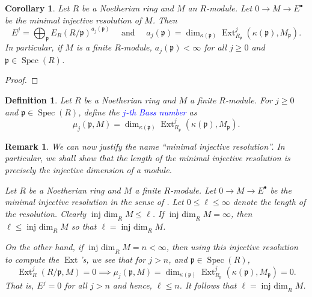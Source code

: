 \documentclass[10pt]{article}
\theoremstyle{thmstyle}
\theoremstyle{defstyle}
\newtheorem{definition}[theorem]{Definition}
\newtheorem{corollary}[theorem]{Corollary}
\newtheorem{remark}[theorem]{Remark}
\newcommand{\Spec}{\operatorname{Spec}}
\newcommand{\frakp}{\mathfrak{p}} %
\newcommand{\define}[1]{\textcolor{blue}{\textit{#1}}}
\renewcommand{\le}{\leqslant}
\renewcommand{\ge}{\geqslant}
\newcommand{\Ext}{\operatorname{Ext}}
\newcommand{\injdim}{\operatorname{inj~dim}}
\begin{document}
\begin{corollary}
    Let $R$ be a Noetherian ring and $M$ an $R$-module. Let $0\to M\to E^\bullet$ be \emph{the} minimal injective resolution of $M$. Then 
    \begin{equation*}
        E^j = \bigoplus_{\frakp}E_R\left(R/\frakp\right)^{a_j(\frakp)}\quad\text{ and }\quad a_j(\frakp) = \dim_{\kappa(\frakp)} \Ext^j_{R_\frakp}\left(\kappa(\frakp), M_\frakp\right).
    \end{equation*}
    In particular, if $M$ is a finite $R$-module, $a_j(\frakp) < \infty$ for all $j\ge 0$ and $\frakp\in\Spec(R)$.
\end{corollary}
\begin{proof}
\end{proof}

\begin{definition}
    Let $R$ be a Noetherian ring and $M$ a finite $R$-module. For $j\ge 0$ and $\frakp\in\Spec(R)$, define the \define{$j$-th Bass number} as 
    \begin{equation*}
        \mu_j\left(\frakp, M\right) = \dim_{\kappa(\frakp)}\Ext_{R_\frakp}^j\left(\kappa(\frakp), M_\frakp\right).
    \end{equation*}
\end{definition}

\begin{remark}
    We can now justify the name ``minimal injective resolution''. In particular, we shall show that the length of the minimal injective resolution is precisely the injective dimension of a module. 
    
    Let $R$ be a Noetherian ring and $M$ a finite $R$-module. Let $0\to M\to E^\bullet$ be \emph{the} minimal injective resolution in the sense of . Let $0\le\ell\le\infty$ denote the length of the resolution. Clearly $\injdim_R M\le\ell$. If $\injdim_R M = \infty$, then $\ell\le\injdim_R M$ so that $\ell = \injdim_R M$. 

    On the other hand, if $\injdim_R M = n < \infty$, then using this injective resolution to compute the $\Ext$'s, we see that for $j > n$, and $\frakp\in\Spec(R)$, 
    \begin{equation*}
        \Ext^{j}_R(R/\frakp, M) = 0\implies\mu_j(\frakp, M) = \dim_{\kappa(\frakp)}\Ext^{j}_{R_\frakp}\left(\kappa(\frakp), M_\frakp\right) = 0.
    \end{equation*}
    That is, $E^j = 0$ for all $j > n$ and hence, $\ell\le n$. It follows that $\ell = \injdim_R M$.
\end{remark}
\end{document}
